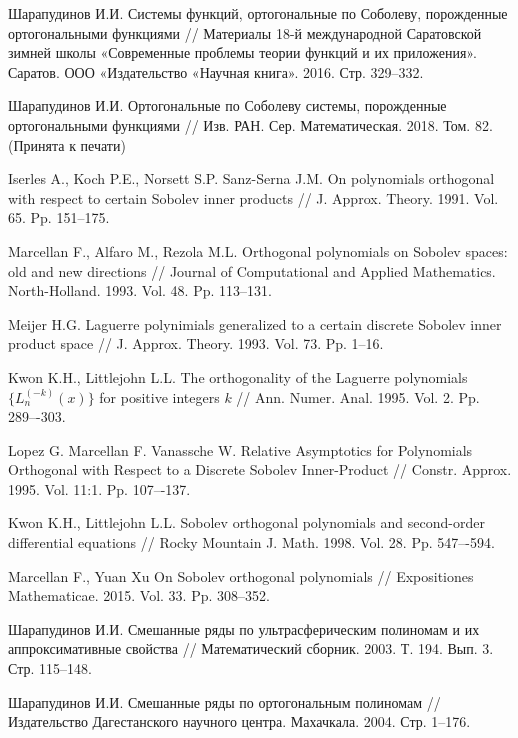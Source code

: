\begin{thebibliography}{999}
 {Шарапудинов И.И.}
Системы функций, ортогональные по Соболеву, порожденные ортогональными функциями // Материалы 18-й международной Саратовской зимней школы «Современные проблемы теории функций и их приложения». Саратов. ООО «Издательство «Научная книга». 2016. Стр. 329--332.

 Шарапудинов И.И. Ортогональные  по Соболеву системы, порожденные ортогональными функциями // Изв. РАН. Сер. Математическая. 2018. Том. 82. (Принята к печати)

 {Iserles A., Koch P.E., Norsett S.P. Sanz-Serna J.M.}
On polynomials  orthogonal  with respect  to certain Sobolev inner products // J. Approx. Theory. 1991. Vol. 65. Pp. 151--175.

 {Marcellan F., Alfaro M., Rezola M.L.}
Orthogonal polynomials on Sobolev spaces: old and new directions // Journal of Computational and Applied Mathematics. North-Holland. 1993. Vol. 48. Pp. 113--131.

 {Meijer H.G.}
Laguerre polynimials generalized to a certain discrete Sobolev inner product space // J. Approx. Theory. 1993. Vol. 73. Pp. 1--16.

 {Kwon K.H., Littlejohn L.L.}
The orthogonality of the Laguerre polynomials $\{L_n^{(-k)}(x)\}$ for positive integers $k$ // Ann. Numer. Anal. 1995. Vol. 2. Pp. 289–-303.

 {Lopez G. Marcellan F. Vanassche W.}
Relative Asymptotics for Polynomials Orthogonal with Respect to a Discrete Sobolev Inner-Product // Constr. Approx. 1995. Vol. 11:1. Pp. 107–-137.

 {Kwon K.H., Littlejohn L.L.}
Sobolev orthogonal polynomials and second-order differential equations // Rocky Mountain J. Math. 1998. Vol. 28. Pp. 547–-594.

 {Marcellan F., Yuan Xu}
On Sobolev orthogonal polynomials // Expositiones Mathematicae. 2015. Vol. 33. Pp. 308--352.

 {Шарапудинов И.И.}
Смешанные ряды по ультрасферическим полиномам и их аппроксимативные свойства // Математический сборник. 2003. Т. 194. Вып. 3. Стр. 115--148.

 {Шарапудинов И.И.}
Смешанные ряды по ортогональным полиномам // Издательство Дагестанского научного центра. Махачкала. 2004. Стр. 1--176.


\end{thebibliography}
